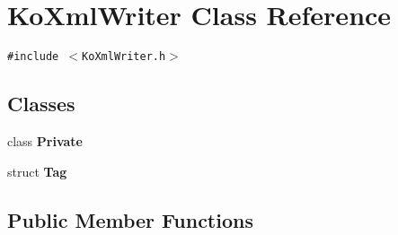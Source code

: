 \hypertarget{classKoXmlWriter}{
\section{KoXmlWriter Class Reference}
\label{classKoXmlWriter}
}
{\tt \#include $<$KoXmlWriter.h$>$}

\subsection*{Classes}
\begin{CompactItemize}
\item 
class \textbf{Private}
\item 
struct \textbf{Tag}
\end{CompactItemize}
\subsection*{Public Member Functions}
